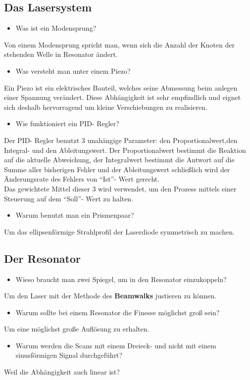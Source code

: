 \documentclass[a4paper,oneside]{article}
\begin{document}
\subsection{Das Lasersystem}
\begin{itemize}
 \item Was ist ein Modensprung?
\end{itemize}
Von einem Modensprung spricht man, wenn sich die Anzahl der Knoten der stehenden Welle in Resonator ändert.
\begin{itemize}
 \item Was versteht man unter einem Piezo?
\end{itemize}
Ein Piezo ist ein elektrisches Bauteil, welches seine Abmessung beim anlegen einer Spannung verändert. Diese Abhängigkeit ist sehr empfindlich und eignet sich deshalb hervorragend um kleine Verschiebungen zu realisieren.

\begin{itemize}
\item Wie funktioniert ein PID- Regler?
\end{itemize}
Der PID- Regler benutzt 3 unahängige Parameter: den Proportionalwert,den Integral- und den Ableitungswert. Der Proportionalwert bestimmt die Reaktion auf die aktuelle Abweichung, der Integralwert bestimmt die Antwort auf die Summe aller bisherigen Fehler und der Ableitungswert schließlich wird der Änderungsrate des Fehlers von ``Ist''- Wert gerecht.\\
Das gewichtete Mittel dieser 3 wird verwendet, um den Prozess mittels einer Steuerung auf dem ``Soll''- Wert zu halten.
\begin{itemize}
\item Warum benutzt man ein Prismenpaar?
\end{itemize}
Um das ellipsenförmige Strahlprofil der Laserdiode symmetrisch zu machen.

\subsection{Der Resonator}
\begin{itemize}
\item Wieso braucht man zwei Spiegel, um in den Resonator einzukoppeln?
\end{itemize}
Um den Laser mit der Methode des \textbf{Beamwalks} justieren zu können.
\begin{itemize}
\item Warum sollte bei einem Resonator die Finesse möglichst groß sein?
\end{itemize}
Um eine möglichst große Auflösung zu erhalten.
\begin{itemize}
\item Warum werden die Scans mit einem Dreieck- und nicht mit einem sinusförmigen Signal durchgeführt?
\end{itemize}
Weil die Abhängigkeit auch linear ist?
\end{document}

